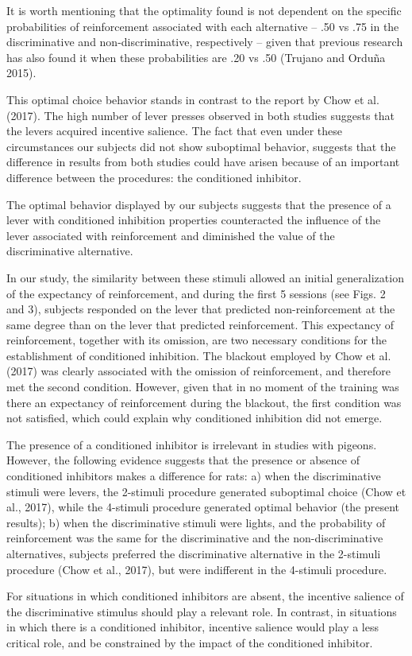 \documentclass[a4paper,12pt]{article}
\begin{document}
It is worth mentioning that the optimality found is not dependent on the specific probabilities of reinforcement associated with each alternative – .50 vs .75 in the discriminative and non-discriminative, respectively – given that previous research has also found it when these probabilities are .20 vs .50 (Trujano and Orduña 2015).

This optimal choice behavior stands in contrast to the report by Chow et al. (2017). The high number of lever presses observed in both studies suggests that the levers acquired incentive salience. The fact that even under these circumstances our subjects did not show suboptimal behavior, suggests that the difference in results from both studies could have arisen because of an important difference between the procedures: the conditioned inhibitor.

The optimal behavior displayed by our subjects suggests that the presence of a lever with conditioned inhibition properties counteracted the influence of the lever associated with reinforcement and diminished the value of the discriminative alternative.

In our study, the similarity between these stimuli allowed an initial generalization of the expectancy of reinforcement, and during the first 5 sessions (see Figs. 2 and 3), subjects responded on the lever that predicted non-reinforcement at the same degree than on the lever that predicted reinforcement. This expectancy of reinforcement, together with its omission, are two necessary conditions for the establishment of conditioned inhibition. The blackout employed by Chow et al. (2017) was clearly associated with the omission of reinforcement, and therefore met the second condition. However, given that in no moment of the training was there an expectancy of reinforcement during the blackout, the first condition was not satisfied, which could explain why conditioned inhibition did not emerge.

The presence of a conditioned inhibitor is irrelevant in studies with pigeons. However, the following evidence suggests that the presence or absence of conditioned inhibitors makes a difference for rats: a) when the discriminative stimuli were levers, the 2-stimuli procedure generated suboptimal choice (Chow et al., 2017), while the 4-stimuli procedure generated optimal behavior (the present results); b) when the discriminative stimuli were lights, and the probability of reinforcement was the same for the discriminative and the non-discriminative alternatives, subjects preferred the discriminative alternative in the 2-stimuli procedure (Chow et al., 2017), but were indifferent in the 4-stimuli procedure.

For situations in which conditioned inhibitors are absent, the incentive salience of the discriminative stimulus should play a relevant role. In contrast, in situations in which there is a conditioned inhibitor, incentive salience would play a less critical role, and be constrained by the impact of the conditioned inhibitor.
\end{document}
